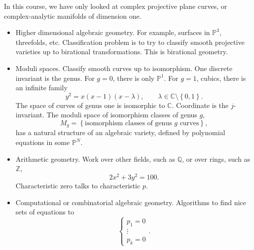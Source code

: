 \documentclass{article}
\newcommand{\Z}{\mathbb{Z}}
\newcommand{\Q}{\mathbb{Q}}
\newcommand{\C}{\mathbb{C}}
\renewcommand{\P}{\mathbb{P}}
\newcommand{\rb}[1]{\left( #1 \right)}
\newcommand{\cb}[1]{\left\{ #1 \right\}}
\theoremstyle{definition}\newtheorem{definition}{Definition}[section]
\theoremstyle{definition}\newtheorem{notation}[definition]{Notation}
\theoremstyle{definition}\newtheorem{remark}[definition]{Remark}
\theoremstyle{definition}\newtheorem{example1}[definition]{Example}
\theoremstyle{definition}\newtheorem{fact}{Fact}
\theoremstyle{definition}\newtheorem{exercise}{Exercise}
\theoremstyle{definition}\newtheorem*{example2}{Example}
\begin{document}
In this course, we have only looked at complex projective plane curves, or complex-analytic manifolds of dimension one.
\begin{itemize}
\item Higher dimensional algebraic geometry. For example, surfaces in $ \P^3 $, threefolds, etc. Classification problem is to try to classify smooth projective varieties up to birational transformations. This is birational geometry.
\item Moduli spaces. Classify smooth curves up to isomorphism. One discrete invariant is the genus. For $ g = 0 $, there is only $ \P^1 $. For $ g = 1 $, cubics, there is an infinite family
$$ y^2 = x\rb{x - 1}\rb{x - \lambda}, \qquad \lambda \in \C \setminus \cb{0, 1}. $$
The space of curves of genus one is isomorphic to $ \C $. Coordinate is the $ j $-invariant. The moduli space of isomorphism classes of genus $ g $,
$$ M_g = \cb{\text{isomorphism classes of genus } g \text{ curves}}, $$
has a natural structure of an algebraic variety, defined by polynomial equations in some $ \P^N $.
\item Arithmetic geometry. Work over other fields, such as $ \Q $, or over rings, such as $ \Z $,
$$ 2x^2 + 3y^2 = 100. $$
Characteristic zero talks to characteristic $ p $.
\item Computational or combinatorial algebraic geometry. Algorithms to find nice sets of equations to
$$ \begin{cases}
p_1 = 0 \\
\vdots \\
p_k = 0
\end{cases}. $$
\end{itemize}
\end{document}

